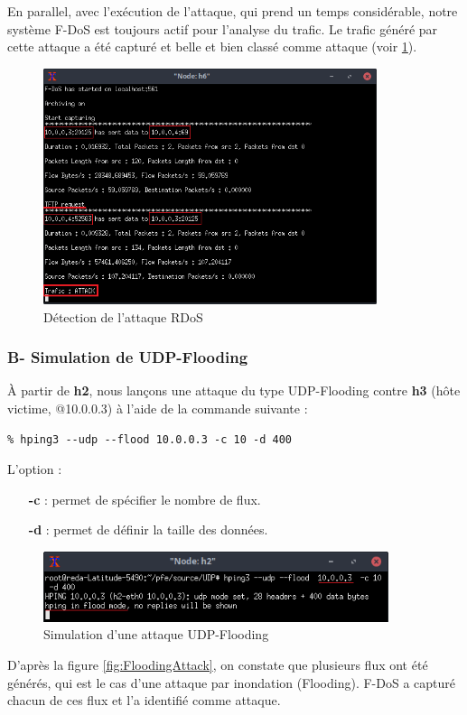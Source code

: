 \noindent En parallel, avec l'exécution de l'attaque, qui prend un temps considérable, notre système F-DoS est toujours actif pour l'analyse du trafic. Le trafic généré par cette attaque a été capturé et belle et bien classé comme attaque (voir \ref{fig:tftpAttack}).
\begin{figure}[h]
\centering
\includegraphics[width=0.87\textwidth]{Figures/simulation/mininet/IDS/attack_tftp}
\decoRule
\caption{Détection de l'attaque RDoS}
\label{fig:tftpAttack}
\end{figure}

\subsubsection{B- Simulation de UDP-Flooding}
À partir de \textbf{h2}, nous lançons une attaque du type UDP-Flooding contre \textbf{h3} (hôte victime, @10.0.0.3) à l'aide de la commande suivante :
\begin{verbatim}
% hping3 --udp --flood 10.0.0.3 -c 10 -d 400
\end{verbatim}
L'option :
\begin{itemize}
\item[\textbf{-c}]: permet de spécifier le nombre de flux.
\item[\textbf{-d}]: permet de définir la taille des données.
\end{itemize}
\begin{figure}[h]
\centering
\includegraphics[width=0.9\textwidth]{Figures/simulation/mininet/UDP/attack_udp_flood}
\decoRule
\caption{Simulation d'une attaque UDP-Flooding}
\label{fig:FloodingAttackSimulation}
\end{figure}
\newpage
D'après la figure \ref{fig:FloodingAttack}, on constate que plusieurs flux ont été générés, qui est le cas d'une attaque par inondation (Flooding). F-DoS a capturé chacun de ces flux et l'a identifié comme attaque.\\

